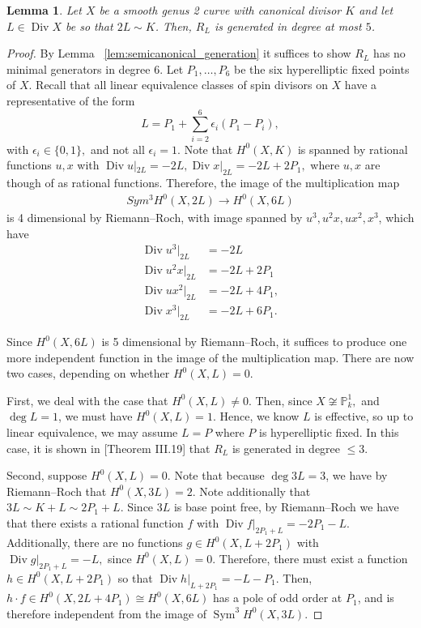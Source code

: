 \documentclass{amsart}
\theoremstyle{plain}
\newtheorem{lem}[thm]{Lemma}
\theoremstyle{definition}
\theoremstyle{remark}
\numberwithin{equation}{section}
\newcommand\BP{{\mathbb P}}
\DeclareMathOperator\di{Div}
\DeclareMathOperator{\sym}{Sym}
\begin{document}
\begin{lem}
\label{lem:genus-2-generation-5}
Let $X$ be a smooth genus 2 curve with canonical divisor $K$ and let $L \in \di X$ be so that $2L \sim K$. 
Then, $R_L$ is generated in degree at most $5$.
\end{lem}
\begin{proof}
By Lemma ~\ref{lem:semicanonical_generation} it suffices to show $R_L$ has no minimal generators in degree 6.
Let $P_1, \ldots, P_6$ be the six hyperelliptic fixed points of $X$. 
Recall that all linear equivalence classes of spin divisors on $X$ have a representative of the form
$$L = P_1 + \sum_{i =2}^{6} \epsilon_i (P_1 - P_i),$$ 
with $\epsilon_i \in \{0,1\},$ and not all $\epsilon_i = 1$. 
Note that $H^0(X,K)$ is spanned by rational functions $u, x$ with $\di u|_{2L} = -2L, \di x|_{2L} = -2L + 2P_1,$ where $u,x$ are though of as rational functions. Therefore, the image of the multiplication map 
\begin{align*}
	Sym^3 H^0(X,2L) \rightarrow H^0(X,6L)
\end{align*}
is 4 dimensional by Riemann--Roch, with image spanned by $u^3,u^2x,ux^2, x^3$, 
which have 
\begin{align*}
	\di u^3|_{2L} &= -2L \\
	\di u^2x|_{2L} &= -2L + 2P_1 \\
	\di ux^2|_{2L} &= -2L+4P_1, \\
	\di x^3|_{2L} &= -2L + 6P_1.
\end{align*}

\noindent
Since $H^0(X,6L)$ is 5 dimensional by Riemann--Roch,
it suffices to produce one more independent function in the image of the multiplication map.
There are now two cases, depending on whether $H^0(X,L) = 0$.

First, we deal with the case that $H^0(X,L) \neq 0$. 
Then, since $X \not \cong \BP^1_k,$ and $\deg L = 1$, we must have $H^0(X,L) = 1$. Hence, we know $L$ is effective, so up to linear equivalence, we may assume $L = P$ where $P$ is hyperelliptic fixed. In this case, it is shown in \cite{neves:halfcan}[Theorem III.19] that $R_L$ is generated in degree $\leq 3$.

Second, suppose $H^0(X,L) = 0$.
Note that because $\deg 3L = 3$, we have by Riemann--Roch that $H^0(X,3L) = 2$. 
Note additionally that $3L \sim K + L \sim 2P_1 + L$. Since $3L$ is base point free, by Riemann--Roch
we have that there exists a rational function $f$ with $\di f|_{2P_1 + L} = -2P_1 - L.$ Additionally, there are no functions $g \in H^0(X,L + 2P_1)$ 
with $\di g|_{2P_1 + L} = -L,$ since $H^0(X,L) = 0.$ Therefore, there must 
exist a function $h \in H^0(X,L+2P_1)$ so that $\di h|_{L + 2P_1} = -L - P_1$.
Then, $h \cdot f \in H^0(X,2L + 4P_1) \cong H^0(X,6L)$ has a pole of odd 
order at $P_1$, and is therefore independent from the image of $\sym^3 H^0(X,3L)$.
\end{proof}
\end{document}
